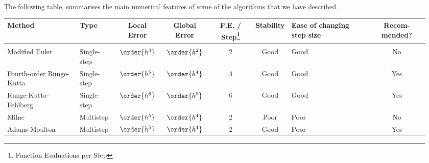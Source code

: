 
\smallskip

The following table, summarises the main numerical features of some of
the algorithms that we have described.

\smallskip

\begin{center} \begin{tabularx}{1.1\textwidth}{llccccXc} \hline
\textbf{Method} & \textbf{Type} & \parbox[b]{12mm}{\textbf{Local Error}} &
\parbox[b]{12mm}{\textbf{Global Error}} &
\parbox[b]{10mm}{\textbf{F.E. / Step\footnote{Function Evaluations per Step}}} &
\textbf{Stability} &
\parbox[b]{15mm}{\textbf{Ease of changing step size}} &
\parbox[b]{10mm}{\textbf{Recom-mended?}} \\*[2mm] \hline \\
Modified Euler & Single-step & $\order{h^3}$ & $\order{h^2}$ & $2$ &
 Good & Good & No \\*[3mm]
\parbox[t]{25mm}{Fourth-order Runge-Kutta} & Single-step & $\order{h^5}$ &
$\order{h^4}$ & $4$ & Good & Good & Yes \\*[7mm]
\parbox[t]{25mm}{Runge-Kutta-Fehlberg} & Single-step & $\order{h^6}$ &
$\order{h^5}$ & $6$ & Good & Good & Yes \\*[7mm]
Milne & Multistep & $\order{h^5}$ & $\order{h^4}$ & 2 & Poor & Poor & No \\*[4mm]
Adams-Moulton & Multistep & $\order{h^5}$ & $\order{h^4}$ & 2 & Good & Poor &
Yes \\*[3mm] \hline
\end{tabularx} \end{center}

